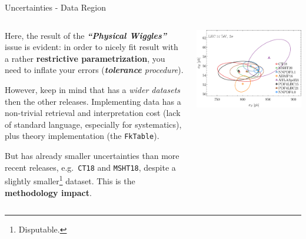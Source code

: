 \documentclass[9pt]{beamer}
\begin{document}
\begin{frame}{Uncertainties - Data Region}
    \begin{columns}
        \begin{column}{0.5\textwidth}
            \vspace*{10pt}

            Here, the result of the \textbf{\textit{\enquote{Physical
            Wiggles}}} issue is evident: in order to nicely fit result with a
            rather \textbf{restrictive parametrization}, you need to inflate
            your errors (\textit{\alert{\textbf{tolerance}} procedure}).
            \vspace*{15pt}

            However, keep in mind that  has a \textit{wider
            datasets} then the other releases.\newline
            Implementing data has a non-trivial retrieval and interpretation
            cost (lack of standard language, especially for systematics), plus
            theory implementation (the \texttt{FkTable}).
            \vspace*{15pt}

            But  has already smaller uncertainties than more recent
            releases, e.g.\ \texttt{CT18} and \texttt{MSHT18}, despite a
            slightly smaller\footnote{Disputable.} dataset.\newline
            This is the \alert{\textbf{methodology impact}}.
            \vspace*{15pt}
        \end{column}
        \begin{column}{0.5\textwidth}
            \begin{tcolorbox}
                \includegraphics[width=\textwidth]{Corr_Z2H14TeV_2sigma}
            \end{tcolorbox}
        \end{column}
    \end{columns}
\end{frame}
\end{document}
